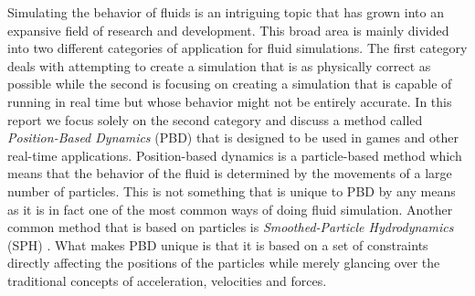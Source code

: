 Simulating the behavior of fluids is an intriguing topic that has grown into an
expansive field of research and development. This broad area is mainly divided
into two different categories of application for fluid simulations. The first
category deals with attempting to create a simulation that is as physically
correct as possible while the second is focusing on creating a simulation that
is capable of running in real time but whose behavior might not be entirely
accurate. In this report we focus solely on the second category and discuss a
method called \textit{Position-Based Dynamics} (PBD) \cite{muller2007position}
that is designed to be used in games and other real-time applications.
Position-based dynamics is a particle-based method which means that the
behavior of the fluid is determined by the movements of a large number of
particles. This is not something that is unique to PBD by
any means as it is in fact one of the most common ways of doing fluid
simulation. Another common method that is based on particles is
\textit{Smoothed-Particle Hydrodynamics} (SPH) \cite{monaghan1992smoothed}.
What makes PBD unique is that it is based on a set of constraints directly
affecting the positions of the particles while merely glancing over the
traditional concepts of acceleration, velocities and forces.
